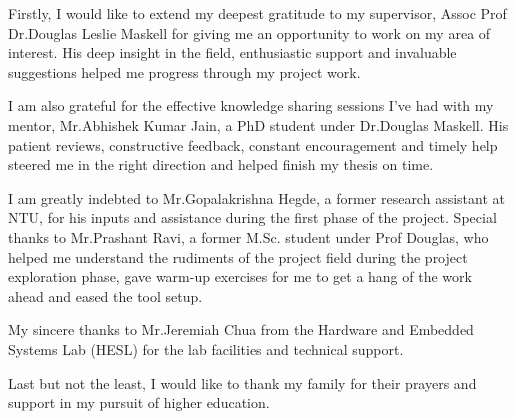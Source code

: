 \quad Firstly, I would like to extend my deepest gratitude to my supervisor, Assoc Prof Dr.Douglas Leslie Maskell for giving me an opportunity to work on my area of interest. His deep insight in the field, enthusiastic support and invaluable suggestions helped me progress through my project work. \newline

I am also grateful for the effective knowledge sharing sessions I’ve had with my mentor, Mr.Abhishek Kumar Jain, a PhD student under Dr.Douglas Maskell. His patient reviews, constructive feedback, constant encouragement and timely help steered me in the right direction and helped finish my thesis on time.\newline 

I am greatly indebted to Mr.Gopalakrishna Hegde, a former research assistant at NTU, for his inputs and assistance during the first phase of the project. Special thanks to Mr.Prashant Ravi, a former M.Sc. student under Prof Douglas, who helped me understand the rudiments of the project field during the project exploration phase, gave warm-up exercises for me to get a hang of the work ahead and eased the tool setup.\newline 

My sincere thanks to Mr.Jeremiah Chua from the Hardware and Embedded Systems Lab (HESL) for the lab facilities and technical support.\newline 

Last but not the least, I would like to thank my family for their prayers and support in my pursuit of higher education. 